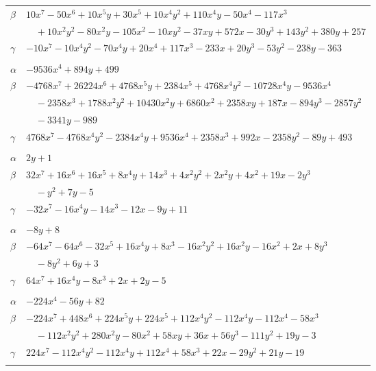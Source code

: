 \documentclass[11pt]{article}
\begin{document}
\begin{longtable}{@{}ll@{}}
$\beta$ & $10x^{7}-50x^{6}+10x^{5}y+30x^{5}+10x^{4}y^{2}+110x^{4}y-50x^{4}-117x^{3}$\\
 & $\quad +10x^{2}y^{2}-80x^{2}y-105x^{2}-10xy^{2}-37xy+572x-30y^{3}+143y^{2}+380y+257$\\
$\gamma$ & $-10x^{7}-10x^{4}y^{2}-70x^{4}y+20x^{4}+117x^{3}-233x+20y^{3}-53y^{2}-238y-363$\\
\addlinespace[3pt]
\multicolumn{2}{@{}l}{$\{i,j\}=\{26,39\}$, $k_{ij}=2\cdot 3$}\\
$\alpha$ & $-9536x^{4}+894y+499$\\
$\beta$ & $-4768x^{7}+26224x^{6}+4768x^{5}y+2384x^{5}+4768x^{4}y^{2}-10728x^{4}y-9536x^{4}$\\
 & $\quad -2358x^{3}+1788x^{2}y^{2}+10430x^{2}y+6860x^{2}+2358xy+187x-894y^{3}-2857y^{2}$\\
 & $\quad -3341y-989$\\
$\gamma$ & $4768x^{7}-4768x^{4}y^{2}-2384x^{4}y+9536x^{4}+2358x^{3}+992x-2358y^{2}-89y+493$\\
\addlinespace[3pt]
\multicolumn{2}{@{}l}{$\{i,j\}=\{26,57\}$, $k_{ij}=2^{2}\cdot 3$}\\
$\alpha$ & $2y+1$\\
$\beta$ & $32x^{7}+16x^{6}+16x^{5}+8x^{4}y+14x^{3}+4x^{2}y^{2}+2x^{2}y+4x^{2}+19x-2y^{3}$\\
 & $\quad -y^{2}+7y-5$\\
$\gamma$ & $-32x^{7}-16x^{4}y-14x^{3}-12x-9y+11$\\
\addlinespace[3pt]
\multicolumn{2}{@{}l}{$\{i,j\}=\{26,75\}$, $k_{ij}=3$}\\
$\alpha$ & $-8y+8$\\
$\beta$ & $-64x^{7}-64x^{6}-32x^{5}+16x^{4}y+8x^{3}-16x^{2}y^{2}+16x^{2}y-16x^{2}+2x+8y^{3}$\\
 & $\quad -8y^{2}+6y+3$\\
$\gamma$ & $64x^{7}+16x^{4}y-8x^{3}+2x+2y-5$\\
\addlinespace[3pt]
\multicolumn{2}{@{}l}{$\{i,j\}=\{26,76\}$, $k_{ij}=2^{3}\cdot 3\cdot 5$}\\
$\alpha$ & $-224x^{4}-56y+82$\\
$\beta$ & $-224x^{7}+448x^{6}+224x^{5}y+224x^{5}+112x^{4}y^{2}-112x^{4}y-112x^{4}-58x^{3}$\\
 & $\quad -112x^{2}y^{2}+280x^{2}y-80x^{2}+58xy+36x+56y^{3}-111y^{2}+19y-3$\\
$\gamma$ & $224x^{7}-112x^{4}y^{2}-112x^{4}y+112x^{4}+58x^{3}+22x-29y^{2}+21y-19$\\
\addlinespace[3pt]
\multicolumn{2}{@{}l}{$\{i,j\}=\{26,81\}$, $k_{ij}=2^{2}\cdot 3$}\\

\end{longtable}
\end{document}
